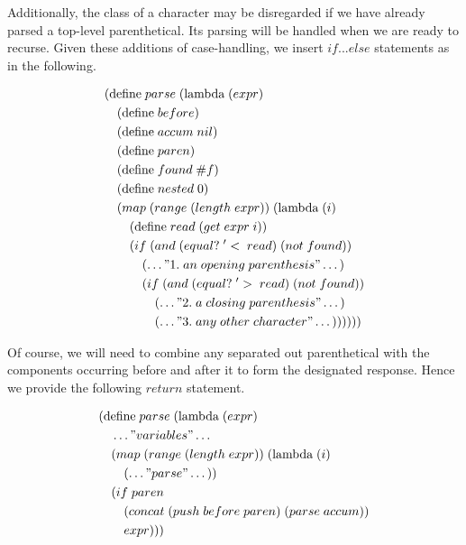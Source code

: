 Additionally, the class of a character may be disregarded if we have already parsed a 
top-level parenthetical. Its parsing will be handled when we are ready to recurse. Given 
these additions of case-handling, we insert $if ... else$ statements as in the following.

\begin{figure}[ht]
\caption{}\label{scheme}
\begin{align*}
& (\text{define} \; parse \; (\text{lambda} \; (expr) \; 
\\& \quad (\text{define} \; before)
\\& \quad (\text{define} \; accum \; nil)
\\& \quad (\text{define} \; paren)
\\& \quad (\text{define} \; found \; \#f)
\\& \quad (\text{define} \; nested \; 0)
\\& \quad (map \; (range \; (length \; expr)) \; (\text{lambda} \; (i)
\\& \qquad (\text{define} \; read \; (get \; expr \; i))
\\& \qquad (if \; (and \; (equal? \; '< \; read) \; (not \; found))
\\& \qquad \quad (\dots"1. \; an \; opening \; parenthesis"\dots)
\\& \qquad \quad (if \; (and \; (equal? \; '> \; read) \; (not \; found))
\\& \qquad \qquad (\dots"2. \; a \; closing \; parenthesis"\dots)
\\& \qquad \qquad (\dots"3. \; any \; other \; character"\dots))))))
\end{align*}
\end{figure}

Of course, we will need to combine any separated out parenthetical with the components 
occurring before and after it to form the designated response. Hence we provide the 
following $return$ statement.

\begin{figure}[ht]
\caption{}\label{scheme}
\begin{align*}
& (\text{define} \; parse \; (\text{lambda} \; (expr) \; 
\\& \quad \dots"variables"\dots
\\& \quad (map \; (range \; (length \; expr)) \; (\text{lambda} \; (i)
\\& \qquad (\dots"parse"\dots))
\\& \quad (if \; paren
\\& \qquad (concat \; (push \; before \; paren) \; (parse \; accum))
\\& \qquad expr)))
\end{align*}
\end{figure}

